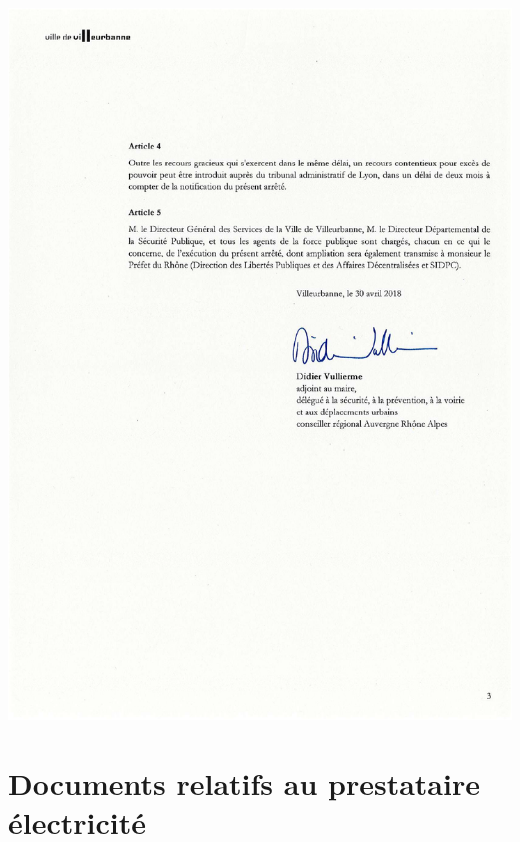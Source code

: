 \documentclass[hidelinks, paper=a4, fontsize=13pt]{report}
\begin{document}
\begin{center}
\includegraphics[scale=0.70]{Annexes/Documents/VilleurbanneGrandRassemblement3}
\end{center}

\section{Documents relatifs au prestataire électricité}
\end{document}
